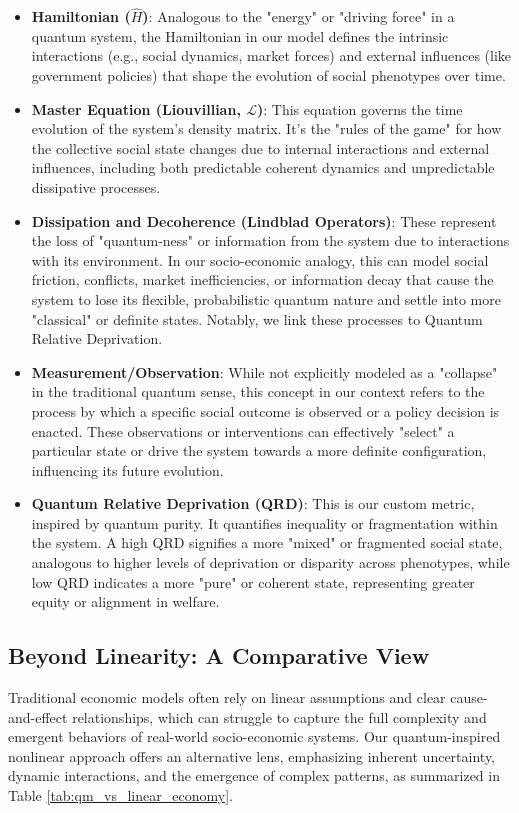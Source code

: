 \documentclass[9pt]{article}
\begin{document}
\begin{itemize}
    \item \textbf{Hamiltonian ($\hat{H}$)}: Analogous to the "energy" or "driving force" in a quantum system, the Hamiltonian in our model defines the intrinsic interactions (e.g., social dynamics, market forces) and external influences (like government policies) that shape the evolution of social phenotypes over time.
    \item \textbf{Master Equation (Liouvillian, $\mathcal{L}$)}: This equation governs the time evolution of the system's density matrix. It's the "rules of the game" for how the collective social state changes due to internal interactions and external influences, including both predictable coherent dynamics and unpredictable dissipative processes.
    \item \textbf{Dissipation and Decoherence (Lindblad Operators)}: These represent the loss of "quantum-ness" or information from the system due to interactions with its environment. In our socio-economic analogy, this can model social friction, conflicts, market inefficiencies, or information decay that cause the system to lose its flexible, probabilistic quantum nature and settle into more "classical" or definite states. Notably, we link these processes to Quantum Relative Deprivation.
    \item \textbf{Measurement/Observation}: While not explicitly modeled as a "collapse" in the traditional quantum sense, this concept in our context refers to the process by which a specific social outcome is observed or a policy decision is enacted. These observations or interventions can effectively "select" a particular state or drive the system towards a more definite configuration, influencing its future evolution.
    \item \textbf{Quantum Relative Deprivation (QRD)}: This is our custom metric, inspired by quantum purity. It quantifies inequality or fragmentation within the system. A high QRD signifies a more "mixed" or fragmented social state, analogous to higher levels of deprivation or disparity across phenotypes, while low QRD indicates a more "pure" or coherent state, representing greater equity or alignment in welfare.
\end{itemize}

\subsection{Beyond Linearity: A Comparative View}
Traditional economic models often rely on linear assumptions and clear cause-and-effect relationships, which can struggle to capture the full complexity and emergent behaviors of real-world socio-economic systems. Our quantum-inspired nonlinear approach offers an alternative lens, emphasizing inherent uncertainty, dynamic interactions, and the emergence of complex patterns, as summarized in Table \ref{tab:qm_vs_linear_economy}.
\end{document}
